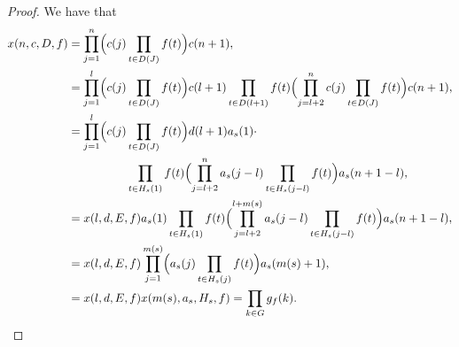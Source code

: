 \documentclass[12pt]{article}
\theoremstyle{plain}
\theoremstyle{definition}
\begin{document}
\begin{proof}
  We have that
  \begin{align*}
    x(n, c, D, f) &= \prod_{j=1}^n\Bigl( c(j) \prod_{t \in D(J)} f(t)
  \Bigr) c(n+1), \\
  &= \prod_{j=1}^l\Bigl( c(j) \prod_{t \in D(J)} f(t) \Bigr) c(l+1)
  \prod_{t \in D(l+1)} f(t) \Bigl( \prod_{j=l+2}^n c(j) \prod_{t \in D(J)}
  f(t) \Bigr) c(n+1), \\
  &= \prod_{j=1}^l\Bigl( c(j) \prod_{t \in D(J)} f(t) \Bigr)
  d(l+1)a_s(1) \cdot \\
  &\hspace{5em} \prod_{t \in H_s(1)} f(t) \Bigl( \prod_{j=l+2}^n
  a_s(j-l) \prod_{t \in H_s(j-l)} f(t) \Bigr) a_s(n+1-l), \\
  &= x(l, d, E, f) a_s(1) \prod_{t \in H_s(1)} f(t) \Bigl(
  \prod_{j=l+2}^{l+m(s)} a_s(j-l) \prod_{t \in H_s(j-l)} f(t) \Bigr) a_s(n+1-l), \\
  &= x(l, d, E, f) \prod_{j=1}^{m(s)}\Bigl( a_s(j) \prod_{t \in H_s(j)} f(t)
  \Bigr) a_s(m(s)+1), \\
  &= x(l, d, E, f) x(m(s), a_s, H_s, f) = \prod_{k \in G} g_f(k).
  \end{align*}
\end{proof}
\end{document}
